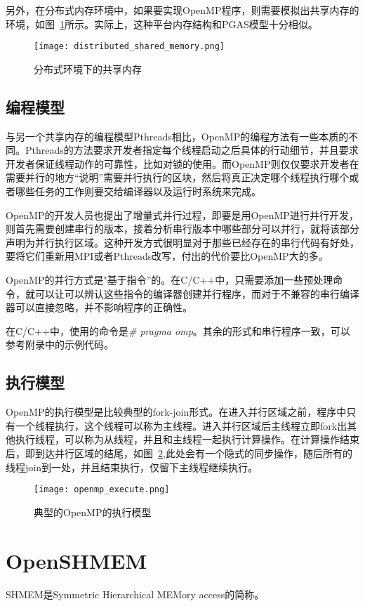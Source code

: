 另外，在分布式内存环境中，如果要实现OpenMP程序，则需要模拟出共享内存的环境，如图~\ref{fig:dis_shared_memo}所示。实际上，这种平台内存结构和PGAS模型十分相似。
\begin{figure}
\centering 
\texttt{[image: distributed\_shared\_memory.png]}
\caption{分布式环境下的共享内存}\label{fig:dis_shared_memo}
\end{figure}

\subsection{编程模型}
与另一个共享内存的编程模型Pthreads相比，OpenMP的编程方法有一些本质的不同\cite{book:openmp}\cite{book:intro}。Pthreads的方法要求开发者指定每个线程启动之后具体的行动细节，并且要求开发者保证线程动作的可靠性，比如对锁的使用。而OpenMP则仅仅要求开发者在需要并行的地方“说明”需要并行执行的区块，然后将真正决定哪个线程执行哪个或者哪些任务的工作则要交给编译器以及运行时系统来完成。

OpenMP的开发人员也提出了增量式并行过程，即要是用OpenMP进行并行开发，则首先需要创建串行的版本，接着分析串行版本中哪些部分可以并行，就将该部分声明为并行执行区域。这种开发方式很明显对于那些已经存在的串行代码有好处，要将它们重新用MPI或者Pthreads改写，付出的代价要比OpenMP大的多。

OpenMP的并行方式是"基于指令”的。在C/C++中，只需要添加一些预处理命令，就可以让可以辨认这些指令的编译器创建并行程序，而对于不兼容的串行编译器可以直接忽略，并不影响程序的正确性。 

在C/C++中，使用的命令是\emph{\# pragma omp}。其余的形式和串行程序一致，可以参考附录中的示例代码。

\subsection{执行模型}\label{sec:shared_exe}
OpenMP的执行模型是比较典型的fork-join形式。在进入并行区域之前，程序中只有一个线程执行，这个线程可以称为主线程。进入并行区域后主线程立即fork出其他执行线程，可以称为从线程，并且和主线程一起执行计算操作。在计算操作结束后，即到达并行区域的结尾，如图~\ref{fig:openmp_execute},此处会有一个隐式的同步操作，随后所有的线程join到一处，并且结束执行，仅留下主线程继续执行。
\begin{figure}
\centering
\texttt{[image: openmp\_execute.png]}
\caption{典型的OpenMP的执行模型}\label{fig:openmp_execute}
\end{figure}
\section{OpenSHMEM}
SHMEM是Symmetric Hierarchical MEMory access的简称\cite{book:encyclopedia}。

